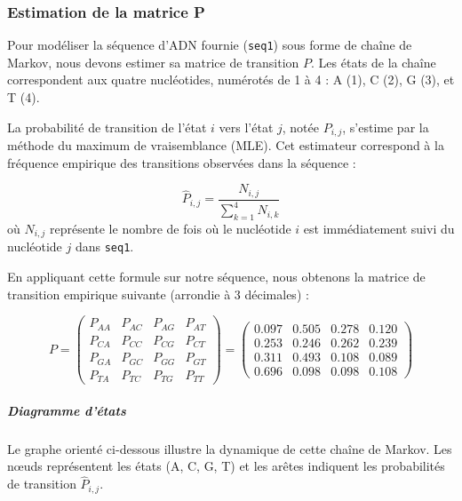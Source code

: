 \subsubsection{Estimation de la matrice P}

Pour modéliser la séquence d'ADN fournie (\texttt{seq1}) sous forme de chaîne de Markov, 
nous devons estimer sa matrice de transition $P$. Les états de la chaîne correspondent aux 
quatre nucléotides, numérotés de 1 à 4 : A (1), C (2), G (3), et T (4).

La probabilité de transition de l'état $i$ vers l'état $j$, notée $P_{i,j}$, 
s'estime par la méthode du maximum de vraisemblance (MLE). 
Cet estimateur correspond à la fréquence empirique des transitions 
observées dans la séquence :

\begin{equation}
    \hat{P}_{i,j} = \frac{N_{i,j}}{\sum_{k=1}^{4} N_{i,k}}
\end{equation}
où $N_{i,j}$ représente le nombre de fois où le nucléotide $i$ est immédiatement 
suivi du nucléotide $j$ dans \texttt{seq1}.

En appliquant cette formule sur notre séquence, nous obtenons la 
matrice de transition empirique suivante (arrondie à 3 décimales) :

\begin{equation}
    P = 
    \begin{pmatrix}
        P_{AA} & P_{AC} & P_{AG} & P_{AT} \\
        P_{CA} & P_{CC} & P_{CG} & P_{CT} \\
        P_{GA} & P_{GC} & P_{GG} & P_{GT} \\
        P_{TA} & P_{TC} & P_{TG} & P_{TT}
    \end{pmatrix}
    =
    \begin{pmatrix}
        0.097 & 0.505 & 0.278 & 0.120 \\ %
        0.253 & 0.246 & 0.262 & 0.239 \\ %
        0.311 & 0.493 & 0.108 & 0.089 \\ %
        0.696 & 0.098 & 0.098 & 0.108    %
    \end{pmatrix}
\end{equation}

\subparagraph{Diagramme d'états}
Le graphe orienté ci-dessous illustre la dynamique de cette chaîne de Markov. 
Les nœuds représentent les états (A, C, G, T) et les arêtes indiquent les probabilités 
de transition $\hat{P}_{i,j}$.

